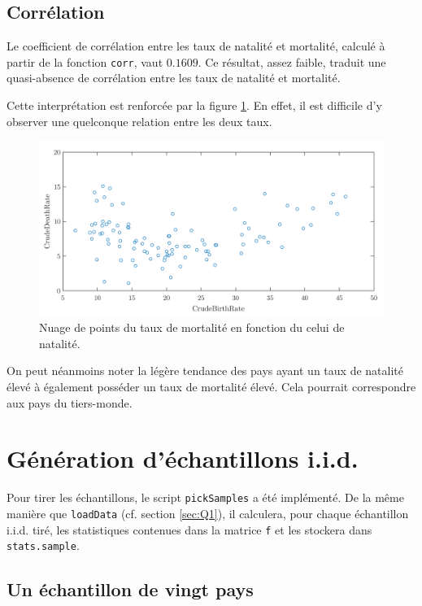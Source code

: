 \documentclass[a4paper, 12pt]{article}
\begin{document}
	\subsection{Corrélation} \label{sec:Q1f}
	Le coefficient de corrélation entre les taux de natalité et mortalité, calculé à partir de la fonction \texttt{corr}, vaut $\num{0.1609}$. Ce résultat, assez faible, traduit une quasi-absence de corrélation entre les taux de natalité et mortalité. \par
	Cette interprétation est renforcée par la figure \ref{figure:Q1f}. En effet, il est difficile d'y observer une quelconque relation entre les deux taux. \par
	\begin{figure}[h!]
		\centering
		\includegraphics[scale=0.24]{resources/pdf/q1f.pdf}
		\caption{Nuage de points du taux de mortalité en fonction du celui de natalité.}
		\label{figure:Q1f}
	\end{figure}
    On peut néanmoins noter la légère tendance des pays ayant un taux de natalité élevé à également posséder un taux de mortalité élevé. Cela pourrait correspondre aux pays du tiers-monde.
	\section{Génération d'échantillons i.i.d.} \label{sec:Q2}
	Pour tirer les échantillons, le script \texttt{pickSamples} a été implémenté. De la même manière que \texttt{loadData} (cf. section \ref{sec:Q1}), il calculera, pour chaque échantillon i.i.d. tiré, les statistiques contenues dans la matrice \texttt{f} et les stockera dans \texttt{stats.sample}.
	\subsection{Un échantillon de vingt pays} \label{sec:Q2a}
\end{document}
